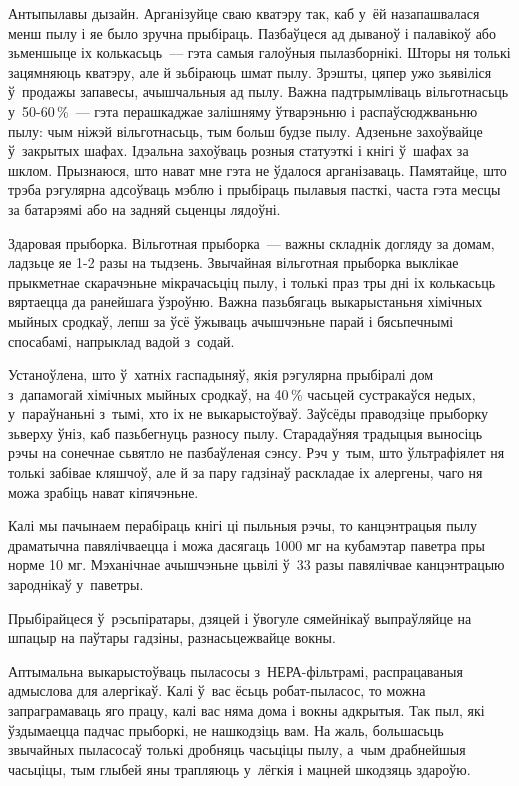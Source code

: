 Антыпылавы дызайн. Арганізуйце сваю кватэру так, каб у~ёй назапашвалася менш пылу і яе было зручна прыбіраць. Пазбаўцеся ад дываноў і палавікоў або зьменшыце іх колькасьць~--- гэта самыя галоўныя пылазборнікі. Шторы ня толькі зацямняюць кватэру, але й зьбіраюць шмат пылу. Зрэшты, цяпер ужо зьявіліся ў~продажы запавесы, ачышчальныя ад пылу. Важна падтрымліваць вільготнасьць у~50-60\,\%~--- гэта перашкаджае залішняму ўтварэньню і распаўсюджваньню пылу: чым ніжэй вільготнасьць, тым больш будзе пылу. Адзеньне захоўвайце ў~закрытых шафах. Ідэальна захоўваць розныя статуэткі і кнігі ў~шафах за шклом. Прызнаюся, што нават мне гэта не ўдалося арганізаваць. Памятайце, што трэба рэгулярна адсоўваць мэблю і прыбіраць пылавыя пасткі, часта гэта месцы за батарэямі або на задняй сьценцы лядоўні.

Здаровая прыборка. Вільготная прыборка~--- важны складнік догляду за домам, ладзьце яе 1-2 разы на тыдзень. Звычайная вільготная прыборка выклікае прыкметнае скарачэньне мікрачасьціц пылу, і толькі праз тры дні іх колькасьць вяртаецца да ранейшага ўзроўню. Важна пазьбягаць выкарыстаньня хімічных мыйных сродкаў, лепш за ўсё ўжываць ачышчэньне парай і бясьпечнымі спосабамі, напрыклад вадой з~содай.

Устаноўлена, што ў~хатніх гаспадыняў, якія рэгулярна прыбіралі дом з~дапамогай хімічных мыйных сродкаў, на 40\,\% часьцей сустракаўся недых, у~параўнаньні з~тымі, хто іх не выкарыстоўваў. Заўсёды праводзіце прыборку зьверху ўніз, каб пазьбегнуць разносу пылу. Старадаўняя традыцыя выносіць рэчы на сонечнае сьвятло не пазбаўленая сэнсу. Рэч у~тым, што ўльтрафіялет ня толькі забівае кляшчоў, але й за пару гадзінаў раскладае іх алергены, чаго ня можа зрабіць нават кіпячэньне.

Калі мы пачынаем перабіраць кнігі ці пыльныя рэчы, то канцэнтрацыя пылу драматычна павялічваецца і можа дасягаць 1000 мг на кубамэтар паветра пры норме 10 мг. Мэханічнае ачышчэньне цьвілі ў~33 разы павялічвае канцэнтрацыю зароднікаў у~паветры.

Прыбірайцеся ў~рэсьпіратары, дзяцей і ўвогуле сямейнікаў выпраўляйце на шпацыр на паўтары гадзіны, разнасьцежвайце вокны.

Аптымальна выкарыстоўваць пыласосы з~НЕРА-фільтрамі, распрацаваныя адмыслова для алергікаў. Калі ў~вас ёсьць робат-пыласос, то можна запраграмаваць яго працу, калі вас няма дома і вокны адкрытыя. Так пыл, які ўздымаецца падчас прыборкі, не нашкодзіць вам. На жаль, большасьць звычайных пыласосаў толькі дробняць часьціцы пылу, а~чым драбнейшыя часьціцы, тым глыбей яны трапляюць у~лёгкія і мацней шкодзяць здароўю.

